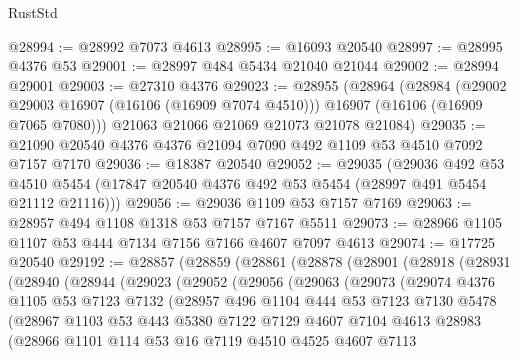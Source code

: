 \begin{lexlean}{RustStd}
\begin{coremodule}
@28994 := @28992 @7073 @4613
@28995 := @16093 @20540
@28997 := @28995 @4376 @53
@29001 := @28997 @484 @5434 @21040 @21044
@29002 := @28994 @29001
@29003 := @27310 @4376
@29023 := @28955
    (@28964
      (@28984
        (@29002 @29003 @16907 (@16106 (@16909 @7074 @4510)))
        @16907
        (@16106 (@16909 @7065 @7080)))
      @21063
      @21066
      @21069
      @21073
      @21078
      @21084)
@29035 := @21090 @20540 @4376 @4376 @21094 @7090 @492 @1109 @53 @4510 @7092 @7157 @7170
@29036 := @18387 @20540
@29052 := @29035
    (@29036
      @492
      @53
      @4510
      @5454
      (@17847 @20540 @4376 @492 @53 @5454 (@28997 @491 @5454 @21112 @21116)))
@29056 := @29036 @1109 @53 @7157 @7169
@29063 := @28957 @494 @1108 @1318 @53 @7157 @7167 @5511
@29073 := @28966 @1105 @1107 @53 @444 @7134 @7156 @7166 @4607 @7097 @4613
@29074 := @17725 @20540
@29192 := @28857
    (@28859
      (@28861
        (@28878
          (@28901
            (@28918
              (@28931
                (@28940
                  (@28944
                    (@29023
                      (@29052
                        (@29056
                          (@29063
                            (@29073
                              (@29074
                                @4376
                                @1105
                                @53
                                @7123
                                @7132
                                (@28957
                                  @496
                                  @1104
                                  @444
                                  @53
                                  @7123
                                  @7130
                                  @5478
                                  (@28967
                                    @1103
                                    @53
                                    @443
                                    @5380
                                    @7122
                                    @7129
                                    @4607
                                    @7104
                                    @4613
                                    @28983
                                    (@28966
                                      @1101
                                      @114
                                      @53
                                      @16
                                      @7119
                                      @4510
                                      @4525
                                      @4607
                                      @7113

\end{coremodule}
\end{lexlean}
